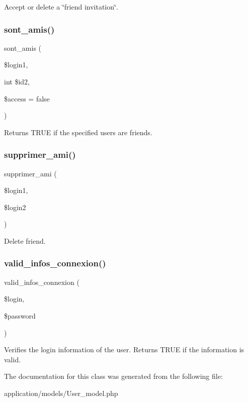 Accept or delete a \char`\"{}friend invitation\char`\"{}. \mbox{\label{class_user__model_a54a357608c9913546f397fad6270e4fb}} 
\subsubsection{\texorpdfstring{sont\+\_\+amis()}{sont\_amis()}}
{\footnotesize\ttfamily sont\+\_\+amis (\begin{DoxyParamCaption}\item[{}]{\$login1,  }\item[{int}]{\$id2,  }\item[{}]{\$access = {\ttfamily false} }\end{DoxyParamCaption})}

Returns T\+R\+UE if the specified users are friends. \mbox{\label{class_user__model_a6bac1a29e9d14095868f8d38b2a814b2}} 
\subsubsection{\texorpdfstring{supprimer\+\_\+ami()}{supprimer\_ami()}}
{\footnotesize\ttfamily supprimer\+\_\+ami (\begin{DoxyParamCaption}\item[{}]{\$login1,  }\item[{}]{\$login2 }\end{DoxyParamCaption})}

Delete friend. \mbox{\label{class_user__model_ad956699f65b6a767bdf9ce2d251633b2}} 
\subsubsection{\texorpdfstring{valid\+\_\+infos\+\_\+connexion()}{valid\_infos\_connexion()}}
{\footnotesize\ttfamily valid\+\_\+infos\+\_\+connexion (\begin{DoxyParamCaption}\item[{}]{\$login,  }\item[{}]{\$password }\end{DoxyParamCaption})}

Verifies the login information of the user. Returns T\+R\+UE if the information is valid. 

The documentation for this class was generated from the following file\+:\begin{DoxyCompactItemize}
\item 
application/models/User\+\_\+model.\+php\end{DoxyCompactItemize}
